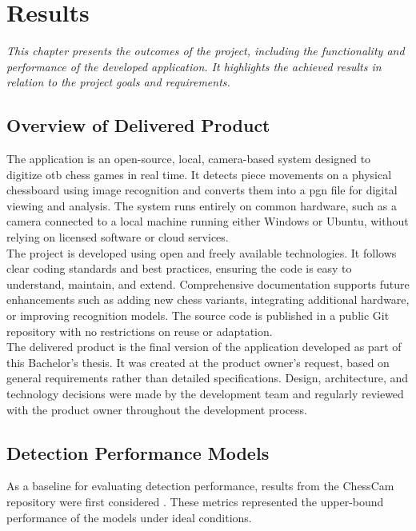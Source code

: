 \chapter{Results}

\begin{center}
    \textit{This chapter presents the outcomes of the project, including the functionality and performance of the developed application. It highlights the achieved results in relation to the project goals and requirements.}
\end{center}

\section{Overview of Delivered Product}
The application is an open-source, local, camera-based system designed to digitize \gls{otb} chess games in real time. It detects piece movements on a physical chessboard using image recognition and converts them into a \gls{pgn} file for digital viewing and analysis. The system runs entirely on common hardware,  such as a camera connected to a local machine running either Windows or Ubuntu, without relying on licensed software or cloud services. \\

The project is developed using open and freely available technologies. It follows clear coding standards and best practices, ensuring the code is easy to understand, maintain, and extend. Comprehensive documentation supports future enhancements such as adding new chess variants, integrating additional hardware, or improving recognition models. The source code is published in a public Git repository with no restrictions on reuse or adaptation. \\

The delivered product is the final version of the application developed as part of this Bachelor’s thesis. It was created at the product owner's request, based on general requirements rather than detailed specifications. Design, architecture, and technology decisions were made by the development team and regularly reviewed with the product owner throughout the development process.

\section{Detection Performance Models}
\label{chesscam-metrics}
As a baseline for evaluating detection performance, results from the ChessCam repository were first considered \cite{github:chesscam}. These metrics represented the upper-bound performance of the models under ideal conditions. \\

